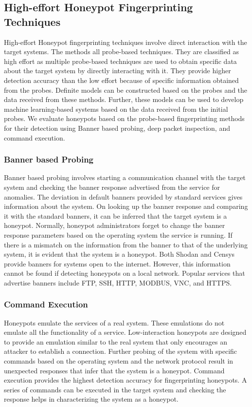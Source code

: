 \documentclass[../main.tex]{subfiles}
\begin{document}
\subsection{High-effort Honeypot Fingerprinting Techniques}
High-effort Honeypot fingerprinting techniques involve direct interaction with the target systems. The methods all probe-based techniques. They are classified as high effort as multiple probe-based techniques are used to obtain specific data about the target system by directly interacting with it. They provide higher detection accuracy than the low effort because of specific information obtained from the probes. Definite models can be constructed based on the probes and the data received from these methods. Further, these models can be used to develop machine learning-based systems based on the data received from the initial probes. We evaluate honeypots based on the probe-based fingerprinting methods for their detection using Banner based probing, deep packet inspection, and command execution.

\subsubsection{Banner based Probing}
Banner based probing involves starting a communication channel with the target system and checking the banner response advertised from the service for anomalies. The deviation in default banners provided by standard services gives information about the system. On looking up the banner response and comparing it with the standard banners, it can be inferred that the target system is a honeypot. Normally, honeypot administrators forget to change the banner response parameters based on the operating system the service is running. If there is a mismatch on the information from the banner to that of the underlying system, it is evident that the system is a honeypot. Both Shodan and Censys provide banners for systems open to the internet. However, this information cannot be found if detecting honeypots on a local network. Popular services that advertise banners include FTP, SSH, HTTP, MODBUS, VNC, and HTTPS. 


\subsubsection{Command Execution}
Honeypots emulate the services of a real system. These emulations do not emulate all the functionality of a service. Low-interaction honeypots are designed to provide an emulation similar to the real system that only encourages an attacker to establish a connection. Further probing of the system with specific commands based on the operating system and the network protocol result in unexpected responses that infer that the system is a honeypot. Command execution provides the highest detection accuracy for fingerprinting honeypots. A series of commands can be executed in the target system and checking the response helps in characterizing the system as a honeypot. 
\end{document}
